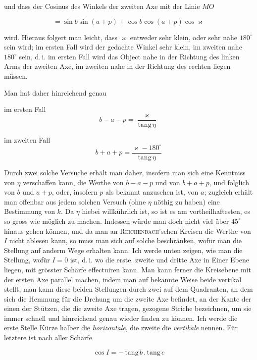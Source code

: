 \noindent und dass der Cosinus des Winkels der zweiten Axe mit der Linie $MO$

\[ = \sin b \sin(a+p) + \cos b \cos(a+p) \cos\varkappa \]

\noindent wird. Hieraus folgert man leicht, dass $\varkappa$ entweder sehr klein, oder sehr nahe $180^\circ$ sein wird; im ersten Fall wird der gedachte Winkel sehr klein, im zweiten nahe $180^\circ$ sein, d.\,i. im ersten Fall wird das Object nahe in der Richtung des linken Arms der zweiten Axe, im zweiten nahe in der Richtung des rechten liegen müssen.

\par\indent Man hat daher hinreichend genau

\noindent im ersten Fall \[ b - a - p = \frac{\varkappa}{\mathrm{tang}\,\eta} \]

\noindent im zweiten Fall \[ b + a + p = \frac{\varkappa - 180^\circ}{\mathrm{tang}\,\eta} \]

\par\indent Durch zwei solche Versuche erhält man daher, insofern man sich eine Kenntniss von $\eta$ verschaffen kann, die Werthe von $b-a-p$ und von $b+a+p$, und folglich von $b$ und $a+p$, oder, insofern $p$ als bekannt anzusehen ist, von $a$; zugleich erhält man offenbar aus jedem solchen Versuch (ohne $\eta$ nöthig zu haben) eine Bestimmung von $k$. Da $\eta$ hiebei willkührlich ist, so ist es am vortheilhaftesten, es so gross wie möglich zu machen. Indessen würde man doch nicht viel über $45^\circ$ hinaus gehen können, und da man an \textsc{Reichenbach}'schen Kreisen die Werthe von $I$ nicht ablesen kann, so muss man sich auf solche beschränken, wofür man die Stellung auf anderm Wege erhalten kann. Ich werde unten zeigen, wie man die Stellung, wofür $I=0$ ist, d.\,i. wo die erste. zweite und dritte Axe in Einer Ebene liegen, mit grösster Schärfe effectuiren kann. Man kann ferner die Kreisebene mit der ersten Axe parallel machen, indem man auf bekannte Weise beide vertikal stellt; man kann diese beiden Stellungen durch zwei auf dem Quadranten, an dem sich die Hemmung für die Drehung um die zweite Axe befindet, an der Kante der einen der Stützen, die die zweite Axe tragen, gezogene Striche bezeichnen, um sie immer schnell und hinreichend genau wieder finden zu können. Ich werde die erste Stelle Kürze halber die \emph{horizontale}, die zweite die \emph{vertikale} nennen. Für letztere ist nach aller Schärfe

\[ \cos I = -\,\mathrm{tang}\,b\,.\,\mathrm{tang}\,c \]

